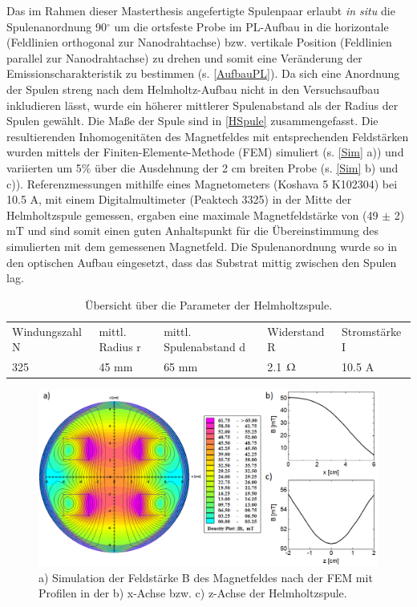 Das im Rahmen dieser Masterthesis angefertigte Spulenpaar erlaubt \textit{in situ} die Spulenanordnung 90$^\circ$ um die ortsfeste Probe im PL-Aufbau in die horizontale (Feldlinien orthogonal zur Nanodrahtachse) bzw. vertikale Position (Feldlinien parallel zur Nanodrahtachse) zu drehen und somit eine Veränderung der Emissionscharakteristik zu bestimmen (s. \autoref{AufbauPL}). Da sich eine Anordnung der Spulen streng nach dem Helmholtz-Aufbau nicht in den Versuchsaufbau inkludieren lässt, wurde ein höherer mittlerer Spulenabstand als der Radius der Spulen gewählt. Die Maße der Spule sind in \autoref{HSpule} zusammengefasst. Die resultierenden Inhomogenitäten des Magnetfeldes mit entsprechenden Feldstärken wurden mittels der Finiten-Elemente-Methode (FEM) simuliert (s. \autoref{Sim} a)) und variierten um 5\% über die Ausdehnung der 2 cm breiten Probe (s. \autoref{Sim} b) und c)). Referenzmessungen mithilfe eines Magnetometers (Koshava 5 K102304) bei 10.5 A, mit einem Digitalmultimeter (Peaktech 3325) in der Mitte der Helmholtzspule gemessen, ergaben eine maximale Magnetfeldstärke von (49 $\pm$ 2) mT und sind somit einen guten Anhaltspunkt für die Übereinstimmung des simulierten mit dem gemessenen Magnetfeld. Die Spulenanordnung wurde so in den optischen Aufbau eingesetzt, dass das Substrat mittig zwischen den Spulen lag.
\begin{table}[h]
\centering
\begin{small}
\begin{tabular}{lllll}
Windungszahl N & mittl. Radius r & mittl. Spulenabstand d & Widerstand R & Stromstärke I\\
325 & 45 mm & 65 mm & 2.1 $\Upomega$ & 10.5 A\\
\end{tabular}
\end{small}
\caption[Dimensionierung der Helmholtzspule]{Übersicht über die Parameter der Helmholtzspule.}
\label{HSpule}
\end{table}
\begin{figure}[h]
\centering
\includegraphics[width=1\textwidth]{Bilder/Methodik/Sim_mag_komplett}
\caption[Simulation des Magnetfeldes der Spule]{a) Simulation der Feldstärke B des Magnetfeldes nach der FEM mit Profilen in der b) x-Achse bzw. c) z-Achse der Helmholtzspule.}
\label{Sim}
\end{figure}
